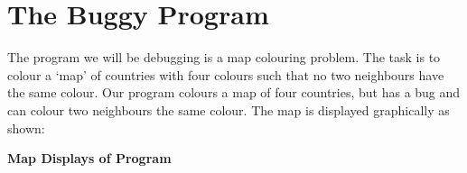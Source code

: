 \section{The Buggy Program}

The program we will be debugging is a map colouring problem. The 
task is to colour a
`map' of countries with four colours such that no two neighbours have the
same colour. Our program colours a map of four countries, but has a bug and
can colour two neighbours the same colour. The map is displayed graphically
as shown: 

\begin{center}
\parbox{0.43\textwidth}{}
\parbox{0.43\textwidth}{}

\vspace{3mm}
{\bf Map Displays of Program}
\end{center}

